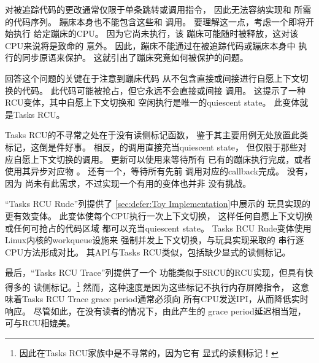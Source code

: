 对被追踪代码的更改通常仅限于单条跳转或调用指令，
因此无法容纳实现和
所需的代码序列。
蹦床本身也不能包含这些和
调用。
要理解这一点，考虑一个即将开始执行
给定蹦床的CPU。
因为它尚未执行，该
蹦床可能随时被释放，这对该CPU来说将是致命的
意外。
因此，蹦床不能通过在被追踪代码或蹦床本身中
执行的同步原语来保护。
这就引出了蹦床究竟如何被保护的问题。

回答这个问题的关键在于注意到蹦床代码
从不包含直接或间接进行自愿上下文切换的代码。
此代码可能被抢占，但它永远不会直接或间接
调用。
这提示了一种RCU变体，其中自愿上下文切换和
空闲执行是唯一的quiescent state。
此变体就是Tasks RCU。

Tasks RCU的不寻常之处在于没有读侧标记函数，
鉴于其主要用例无处放置此类标记，这倒是件好事。
相反，的调用直接充当quiescent state，
但仅限于那些对应自愿上下文切换的调用。
更新可以使用来等待所有
已有的蹦床执行完成，或者使用其异步对应物
。
还有一个，等待所有先前
调用对应的callback完成。
没有，因为
尚未有此需求，不过实现一个有用的变体也并非
没有挑战。

\QuickQuizEnd

``Tasks RCU Rude''列提供了
\cref{sec:defer:Toy Implementation}中展示的
玩具实现的更有效变体。
此变体使每个CPU执行一次上下文切换，
这样任何自愿上下文切换或任何可抢占的代码区域
都可以充当quiescent state。
Tasks RCU Rude变体使用Linux内核的workqueue设施来
强制并发上下文切换，与玩具实现采取的
串行逐CPU方法形成对比。
其API与Tasks RCU类似，包括缺少显式的读侧标记。

最后，``Tasks RCU Trace''列提供了一个
功能类似于SRCU的RCU实现，但具有快得多的
读侧标记。\footnote{
	因此在Tasks RCU家族中是不寻常的，因为它有
	显式的读侧标记！}
然而，这种速度是因为这些标记不执行内存屏障指令，
这意味着Tasks RCU Trace grace period通常必须向
所有CPU发送IPI，从而降低实时响应。
尽管如此，在没有读者的情况下，由此产生的
grace period延迟相当短，可与RCU相媲美。

